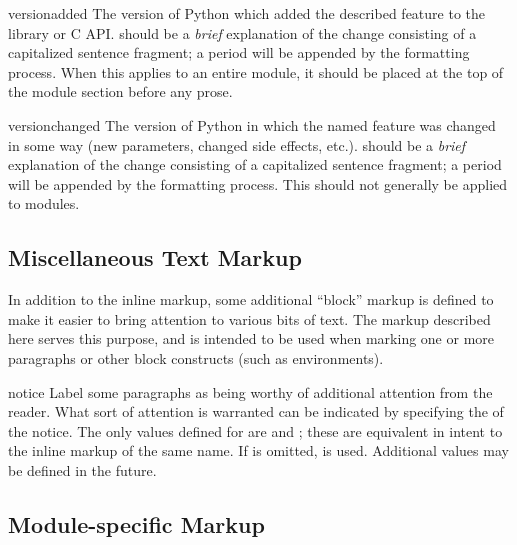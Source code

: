 \documentclass{howto}
\begin{document}
    \begin{macrodesc}{versionadded}{}
      The version of Python which added the described feature to the
      library or C API.   should be a \emph{brief}
      explanation of the change consisting of a capitalized sentence
      fragment; a period will be appended by the formatting process.
      When this applies to an entire module, it should be placed at
      the top of the module section before any prose.
    \end{macrodesc}

    \begin{macrodesc}{versionchanged}{}
      The version of Python in which the named feature was changed in
      some way (new parameters, changed side effects, etc.).
       should be a \emph{brief} explanation of the
      change consisting of a capitalized sentence fragment; a
      period will be appended by the formatting process.  This should
      not generally be applied to modules.
    \end{macrodesc}


  \subsection{Miscellaneous Text Markup \label{misc-text-markup}}

  In addition to the inline markup, some additional ``block'' markup
  is defined to make it easier to bring attention to various bits of
  text.  The markup described here serves this purpose, and is
  intended to be used when marking one or more paragraphs or other
  block constructs (such as  environments).

  \begin{envdesc}{notice}{}
    Label some paragraphs as being worthy of additional attention from
    the reader.  What sort of attention is warranted can be indicated
    by specifying the  of the notice.  The only values
    defined for  are  and ; these
    are equivalent in intent to the inline markup of the same name.
    If  is omitted,  is used.  Additional values
    may be defined in the future.
  \end{envdesc}


  \subsection{Module-specific Markup \label{module-markup}}
\end{document}
